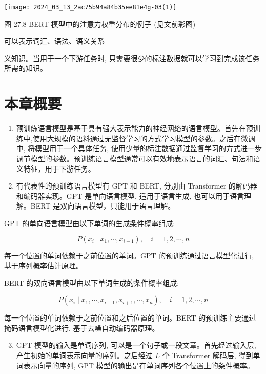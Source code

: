\documentclass[10pt]{article}
\begin{document}
\begin{center}
\texttt{[image: 2024\_03\_13\_2ac75b94a84b35ee81e4g-03(1)]}
\end{center}

图 27.8 BERT 模型中的注意力权重分布的例子 (见文前彩图)

可以表示词汇、语法、语义关系

义知识。当用于一个下游任务时, 只需要很少的标注数据就可以学习到完成该任务所需的知识。

\section*{本章概要}
\begin{enumerate}
  \item 预训练语言模型是基于具有强大表示能力的神经网络的语言模型。首先在预训练中,使用大规模的语料通过无监督学习的方式学习模型的参数。之后在微调中, 将模型用于一个具体任务, 使用少量的标注数据通过监督学习的方式进一步调节模型的参数。预训练语言模型通常可以有效地表示语言的词汇、句法和语义特征，用于下游任务。

  \item 有代表性的预训练语言模型有 GPT 和 BERT, 分别由 Transformer 的解码器和编码器实现。GPT 是单向语言模型, 适用于语言生成, 也可以用于语言理解。BERT 是双向语言模型，只能用于语言理解。

\end{enumerate}

GPT 的单向语言模型由以下单词的生成条件概率组成:

$$
P\left(x_{i} \mid x_{1}, \cdots, x_{i-1}\right), \quad i=1,2, \cdots, n
$$

每一个位置的单词依赖于之前位置的单词。GPT 的预训练通过语言模型化进行, 基于序列概率估计原理。

BERT 的双向语言模型由以下单词生成的条件概率组成:

$$
P\left(x_{i} \mid x_{1}, \cdots, x_{i-1}, x_{i+1}, \cdots, x_{n}\right), \quad i=1,2, \cdots, n
$$

每一个位置的单词依赖于之前位置和之后位置的单词。BERT 的预训练主要通过掩码语言模型化进行, 基于去噪自动编码器原理。

\begin{enumerate}
  \setcounter{enumi}{2}
  \item GPT 模型的输入是单词序列, 可以是一个句子或一段文章。首先经过输入层, 产生初始的单词表示向量的序列。之后经过 $L$ 个 Transformer 解码层, 得到单词表示向量的序列, GPT 模型的输出是在单词序列各个位置上的条件概率。
\end{enumerate}
\end{document}
